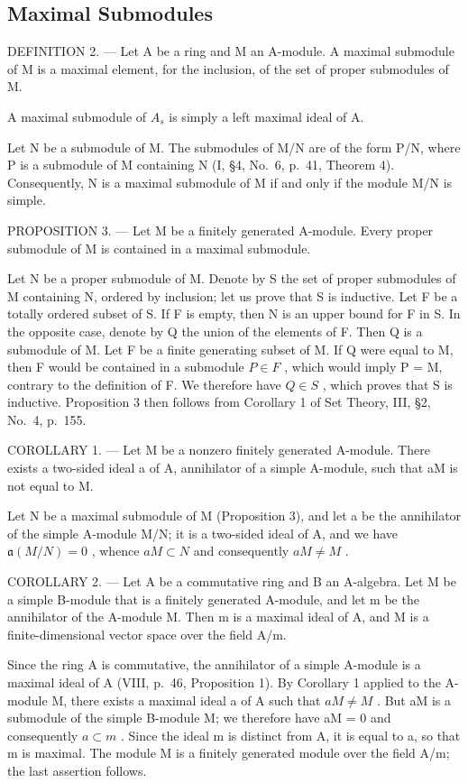 \subsection{Maximal Submodules}

DEFINITION 2. --- Let A be a ring and M an A-module. A maximal submodule of M is a maximal element, for the inclusion, of the set of proper submodules of M.

A maximal submodule of \(A_{s}\) is simply a left maximal ideal of A.

Let N be a submodule of M. The submodules of M/N are of the form P/N, where P is a submodule of M containing N (I, §4, No.~6, p.~41, Theorem 4). Consequently, N is a maximal submodule of M if and only if the module M/N is simple.

PROPOSITION 3. --- Let M be a finitely generated A-module. Every proper submodule of M is contained in a maximal submodule.

Let N be a proper submodule of M. Denote by S the set of proper submodules of M containing N, ordered by inclusion; let us prove that S is inductive. Let F be a totally ordered subset of S. If F is empty, then N is an upper bound for F in S. In the opposite case, denote by Q the union of the elements of F. Then Q is a submodule of M. Let F be a finite generating subset of M. If Q were equal to M, then F would be contained in a submodule \(P \in F\) , which would imply P = M, contrary to the definition of F. We therefore have \(Q \in S\) , which proves that S is inductive. Proposition 3 then follows from Corollary 1 of Set Theory, III, §2, No.~4, p.~155.

COROLLARY 1. --- Let M be a nonzero finitely generated A-module. There exists a two-sided ideal a of A, annihilator of a simple A-module, such that aM is not equal to M.

Let N be a maximal submodule of M (Proposition 3), and let a be the annihilator of the simple A-module M/N; it is a two-sided ideal of A, and we have \(\mathfrak{a}(M/N)=0\) , whence \(aM\subset N\) and consequently \(aM\neq M\) .

COROLLARY 2. --- Let A be a commutative ring and B an A-algebra. Let M be a simple B-module that is a finitely generated A-module, and let m be the annihilator of the A-module M. Then m is a maximal ideal of A, and M is a finite-dimensional vector space over the field A/m.

Since the ring A is commutative, the annihilator of a simple A-module is a maximal ideal of A (VIII, p.~46, Proposition 1). By Corollary 1 applied to the A-module M, there exists a maximal ideal a of A such that \(aM \neq M\) . But aM is a submodule of the simple B-module M; we therefore have aM = 0 and consequently \(a \subset m\) . Since the ideal m is distinct from A, it is equal to a, so that m is maximal. The module M is a finitely generated module over the field A/m; the last assertion follows.

